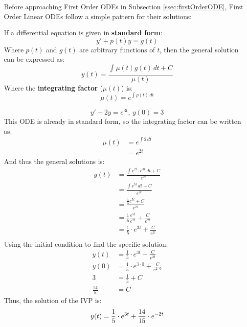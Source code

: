 \documentclass[12pt]{article}
\begin{document}
Before approaching First Order ODEs in Subsection \ref{ssec:firstOrderODE}, First Order Linear ODEs follow a simple pattern for their solutions:

If a differential equation is given in \textbf{standard form}:
\begin{equation*}
  y' + p(t)y = g(t)
\end{equation*}
Where $p(t)$ and $g(t)$ are arbitrary functions of $t$, then the general solution can be expressed as:
\begin{equation*}
  y(t) = \frac{\int_{}^{} \mu(t)g(t) \,dt + C}{\mu(t)}
\end{equation*}
Where the \textbf{integrating factor} ($\mu(t)$) is:
\begin{equation*}
  \mu(t) = e^{\int_{}^{} p(t) \,dt}
\end{equation*}

\begin{example}
  \begin{equation*}
    y' + 2y = e^{3t},\ y(0) = 3
  \end{equation*}
  This ODE is already in standard form, so the integrating factor can be written as:
  \begin{align*}
    \mu(t) &= e^{\int_{}^{} 2 \,dt} \\
           &= e^{2t}
  \end{align*}
  And thus the general solutions is:
  \begin{align*}
    y(t) &= \frac{\int_{}^{} e^{2t} \cdot e^{3t} \,dt + C}{e^{2t}} \\
         &= \frac{\int_{}^{} e^{5t} \,dt + C}{e^{2t}} \\
         &= \frac{\frac{1}{5} e^{5t} + C}{e^{2t}} \\
         &= \frac{1}{5} \frac{e^{5t}}{e^{2t}} + \frac{C}{e^{2t}} \\
         &= \frac{1}{5} \cdot e^{3t} + \frac{C}{e^{2t}} \\
  \end{align*}
  Using the initial condition to find the specific solution:
  \begin{align*}
    y(t) &= \frac{1}{5} \cdot e^{3t} + \frac{C}{e^{2t}} \\
    y(0) &= \frac{1}{5} \cdot e^{3 \cdot 0} + \frac{C}{e^{2 \cdot 0}} \\
    3    &= \frac{1}{5} + C \\
    \frac{14}{5} &= C
  \end{align*}
  Thus, the solution of the IVP is:
  \begin{equation*}
    y(t) = \frac{1}{5} \cdot e^{3t} + \frac{14}{15} \cdot e^{-2t} \\
  \end{equation*}
\end{example}
\end{document}
